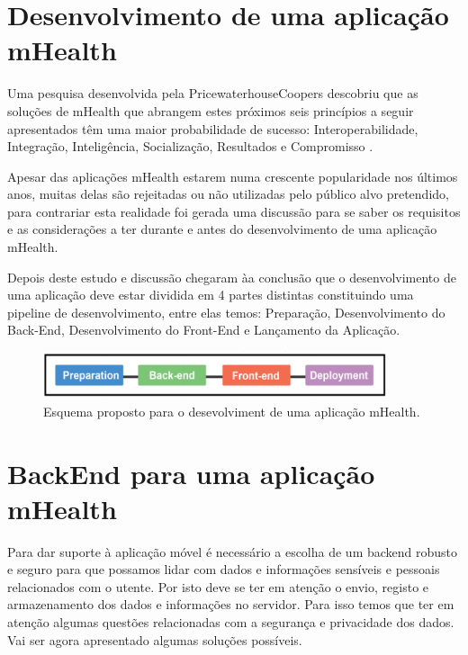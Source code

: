 \section{Desenvolvimento de uma aplica\c c\~ao mHealth}

Uma pesquisa desenvolvida pela PricewaterhouseCoopers descobriu que as solu\c c\~oes de mHealth que abrangem estes pr\'oximos seis princ\'ipios a seguir apresentados t\^em uma maior probabilidade de sucesso: Interoperabilidade, Integra\c c\~ao, Intelig\^encia, Socializa\c c\~ao, Resultados e Compromisso \cite{mhealthinsights}.
\par
Apesar das aplica\c c\~oes mHealth estarem numa crescente popularidade nos \'ultimos anos, muitas delas s\~ao rejeitadas ou n\~ao utilizadas pelo p\'ublico alvo pretendido, para contrariar esta realidade foi gerada uma discuss\~ao para se saber os requisitos e as considera\c c\~oes a ter durante e antes do desenvolvimento de uma aplica\c c\~ao mHealth.
\par
Depois deste estudo e discuss\~ao chegaram \`aa conclus\~ao que o desenvolvimento de uma aplica\c c\~ao deve estar dividida em 4 partes distintas constituindo uma pipeline de desenvolvimento, entre elas temos:  Prepara\c c\~ao, Desenvolvimento do Back-End, Desenvolvimento do Front-End e Lan\c camento da Aplica\c c\~ao\cite{mhealth-pipeline}.

\begin{figure}[!ht]
  \centering
  \includegraphics[width=0.9\textwidth]{imgs/mhealthDevPipeline.png}
  \caption[Esquema proposto para o desevolvimento de uma aplica\c c\~ao mHealth]{Esquema proposto para o desevolviment de uma aplica\c c\~ao mHealth. \cite{mhealth-pipeline}}
  
  \label{f:mhealthpipeline}
\end{figure}

\section{BackEnd para uma aplicação mHealth}

Para dar suporte à aplicação móvel é necessário a escolha de um backend robusto e seguro para que possamos lidar com dados e informações sensíveis e pessoais relacionados com o utente. Por isto deve se ter em atenção o envio, registo e armazenamento dos dados e informações no servidor. Para isso temos que ter em atenção algumas questões relacionadas com a segurança e privacidade dos dados. Vai ser agora apresentado algumas soluções possíveis.

